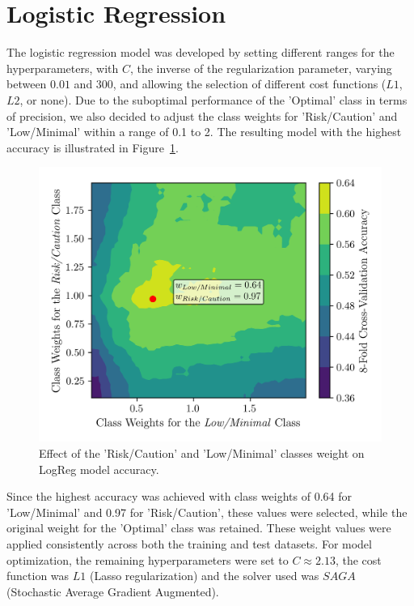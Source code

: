 \documentclass[conference]{IEEEtran}
\begin{document}
\section{Logistic Regression}

The logistic regression model was developed by setting different ranges for the hyperparameters, with $C$, the inverse of the regularization parameter, varying between $0.01$ and $300$, and allowing the selection of different cost functions ($L1$, $L2$, or none). Due to the suboptimal performance of the 'Optimal' class in terms of precision, we also decided to adjust the class weights for 'Risk/Caution' and 'Low/Minimal' within a range of 0.1 to 2. The resulting model with the highest accuracy is illustrated in Figure~\ref{logregWt}.

\begin{figure}[H]
    \centering
    \includegraphics[width=1\linewidth]{assets/LOGR_class_weights.png}
    \caption{Effect of the 'Risk/Caution' and 'Low/Minimal' classes weight on LogReg model accuracy.}
    \label{logregWt}
\end{figure}

Since the highest accuracy was achieved with class weights of 0.64 for 'Low/Minimal' and 0.97 for 'Risk/Caution', these values were selected, while the original weight for the 'Optimal' class was retained. These weight values were applied consistently across both the training and test datasets. For model optimization, the remaining hyperparameters were set to $C \approx 2.13$, the cost function was $L1$ (Lasso regularization) and the solver used was $SAGA$ (Stochastic Average Gradient Augmented).
\end{document}
